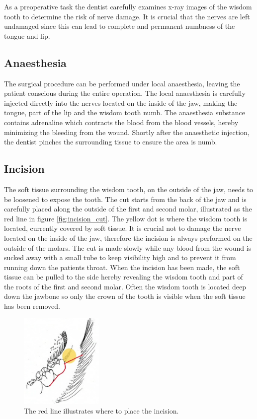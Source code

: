 As a preoperative task
the dentist carefully examines x-ray images of the wisdom tooth to determine
the risk of nerve damage. It is crucial that the nerves are left
undamaged since this can lead to complete and permanent numbness of
the tongue and lip.


\subsection*{Anaesthesia}
The surgical procedure can be performed under local anaesthesia,
leaving the patient conscious during the entire operation. The local
anaesthesia is carefully injected directly into the nerves located on
the inside of the jaw,
making the tongue, part of the lip and the wisdom tooth numb. The
anaesthesia substance contains adrenaline which contracts the blood
from the blood vessels, hereby minimizing the bleeding from the wound.
Shortly after the anaesthetic injection, the dentist
pinches the surrounding tissue to ensure the area is numb. 


\subsection*{Incision}
The soft tissue surrounding the wisdom tooth, on the outside of the
jaw, needs to be loosened to expose the tooth. 
The cut starts from the back of the jaw and is carefully placed along the
outside of the first and second molar, illustrated as the red line in
figure \vref{fig:incision_cut}. The yellow dot is where the wisdom
tooth is located, currently covered by soft tissue. It is crucial not
to damage the nerve located on the inside of the jaw, therefore
the incision is always performed on the outside of the
molars.    
The cut is made slowly while any blood from the wound is sucked away
with a small tube to keep visibility high and to prevent it from
running down the patients throat. 
%
When the incision has been made, the soft tissue can be pulled to the side hereby
revealing the wisdom tooth and part of the roots of the first and
second molar. 
Often the wisdom tooth is located deep down the jawbone so only the crown
of the tooth is visible when the soft tissue has been removed.

\begin{figure}
  \centering
  \includegraphics[width=4cm]{./images/problem_domain_surgery_incision.png}
\caption{The red line illustrates where to place the incision. \textdagger}
\label{fig:incision_cut}
\end{figure}

